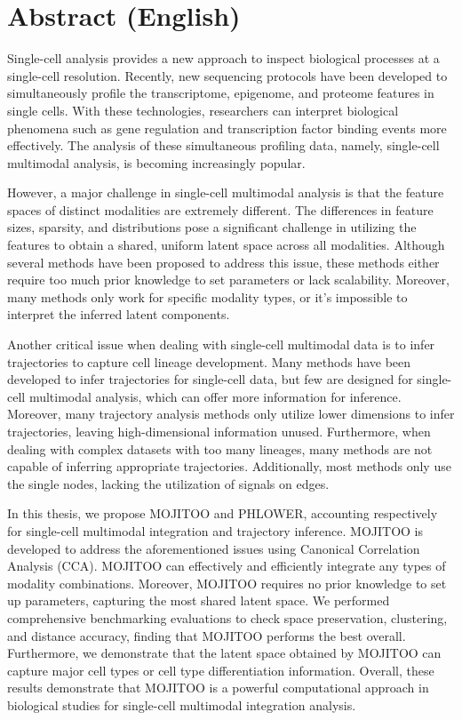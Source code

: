 \chapter*{Abstract (English)}


Single-cell analysis provides a new approach to inspect biological processes at a single-cell resolution. Recently, new sequencing protocols have been developed to simultaneously profile the transcriptome, epigenome, and proteome features in single cells. With these technologies, researchers can interpret biological phenomena such as gene regulation and transcription factor binding events more effectively. The analysis of these simultaneous profiling data, namely, single-cell multimodal analysis, is becoming increasingly popular.

However, a major challenge in single-cell multimodal analysis is that the feature spaces of distinct modalities are extremely different. The differences in feature sizes, sparsity, and distributions pose a significant challenge in utilizing the features to obtain a shared, uniform latent space across all modalities. Although several methods have been proposed to address this issue, these methods either require too much prior knowledge to set parameters or lack scalability. Moreover, many methods only work for specific modality types, or it's impossible to interpret the inferred latent components.

Another critical issue when dealing with single-cell multimodal data is to infer trajectories to capture cell lineage development. Many methods have been developed to infer trajectories for single-cell data, but few are designed for single-cell multimodal analysis, which can offer more information for inference. Moreover, many trajectory analysis methods only utilize lower dimensions to infer trajectories, leaving high-dimensional information unused. Furthermore, when dealing with complex datasets with too many lineages, many methods are not capable of inferring appropriate trajectories. Additionally, most methods only use the single nodes, lacking the utilization of signals on edges.

In this thesis, we propose MOJITOO and PHLOWER, accounting respectively for single-cell multimodal integration and trajectory inference. MOJITOO is developed to address the aforementioned issues using Canonical Correlation Analysis (CCA). MOJITOO can effectively and efficiently integrate any types of modality combinations. Moreover, MOJITOO requires no prior knowledge to set up parameters, capturing the most shared latent space. We performed comprehensive benchmarking evaluations to check space preservation, clustering, and distance accuracy, finding that MOJITOO performs the best overall. Furthermore, we demonstrate that the latent space obtained by MOJITOO can capture major cell types or cell type differentiation information. Overall, these results demonstrate that MOJITOO is a powerful computational approach in biological studies for single-cell multimodal integration analysis.

